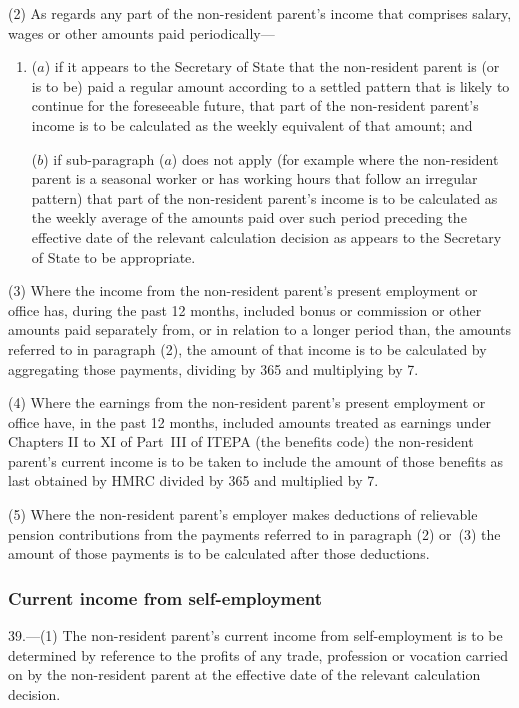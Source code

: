 \documentclass[12pt,a4paper]{article}
\begin{document}
(2) As regards any part of the non-resident parent’s income that comprises salary, wages or other amounts paid periodically—
\begin{enumerate}\item[]
($a$) if it appears to the Secretary of State that the non-resident parent is (or is to be) paid a regular amount according to a settled pattern that is likely to continue for the foreseeable future, that part of the non-resident parent’s income is to be calculated as the weekly equivalent of that amount; and

($b$) if sub-paragraph ($a$)  does not apply (for example where the non-resident parent is a seasonal worker or has working hours that follow an irregular pattern) that part of the non-resident parent’s income is to be calculated as the weekly average of the amounts paid over such period preceding the effective date of the relevant calculation decision as appears to the Secretary of State to be appropriate.
\end{enumerate}

(3) Where the income from the non-resident parent’s present employment or office has, during the past 12 months, included bonus or commission or other amounts paid separately from, or in relation to a longer period than, the amounts referred to in paragraph (2), the amount of that income is to be calculated by aggregating those payments, dividing by 365 and multiplying by 7.

(4) Where the earnings from the non-resident parent’s present employment or office have, in the past 12 months, included amounts treated as earnings under Chapters II to XI of Part~III of ITEPA (the benefits code) the non-resident parent’s current income is to be taken to include the amount of those benefits as last obtained by HMRC divided by 365 and multiplied by 7.

(5) Where the non-resident parent’s employer makes deductions of relievable pension contributions from the payments referred to in paragraph (2) or~(3) the amount of those payments is to be calculated after those deductions.

\subsubsection[39. Current income from self-employment]{Current income from self-employment}

39.---(1)  The non-resident parent’s current income from self-employment is to be determined by reference to the profits of any trade, profession or vocation carried on by the non-resident parent at the effective date of the relevant calculation decision.
\end{document}
